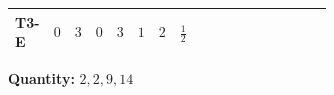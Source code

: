 \documentclass[8pt]{article}
\begin{document}
\begin{landscape}
\begin{longtable}{@{}llcccccc >{\raggedright\arraybackslash}p{0.21\linewidth} >{\raggedright\arraybackslash}p{0.21\linewidth} >{\raggedright\arraybackslash}p{0.21\linewidth}@{}}
T3-E & $0$ & $3$ & $0$ & $3$ & $1$ & $2$ & $\frac{1}{2}$ & \scriptsize\adjustbox{max width=\linewidth}{$\begin{gathered} - \frac{11 \sqrt{3} g_{2}^{2} \overline{y_{1}} \overline{y_{2}}}{8 MF}\end{gathered}$} & \scriptsize\adjustbox{max width=\linewidth}{$\begin{gathered} - \frac{3 \sqrt{11} lambda12Inv2 \overline{y_{1}} \overline{y_{2}}}{22 MF}\end{gathered}$} & \scriptsize\adjustbox{max width=\linewidth}{$\begin{gathered} - \frac{\sqrt{3} g_{1}^{2} \overline{y_{1}} \overline{y_{2}}}{8 MF}\end{gathered}$} \\
\midrule
\bottomrule
\end{longtable}
\clearpage
\noindent\textbf{Quantity: }$\mathrm{2,2,9,14}$\par\smallskip

\end{landscape}
\end{document}

